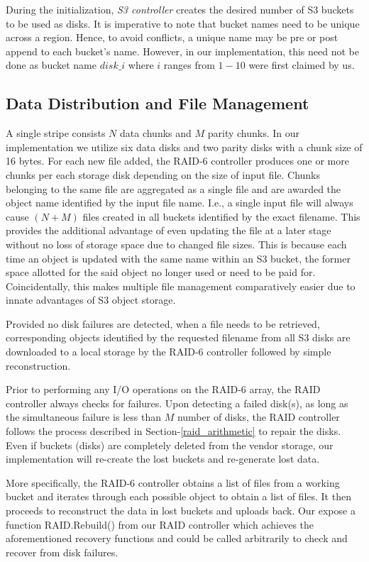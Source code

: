 During the initialization, \textit{S3 controller} creates the desired number of S3 buckets to be used as disks.
It is imperative to note that bucket names need to be unique across a region.
Hence, to avoid conflicts, a unique name may be pre or post append to each bucket's name.
However, in our implementation, this need not be done as bucket name $disk\_i$ where $i$ ranges from $1-10$ were first claimed by us.

\subsection{Data Distribution and File Management}

A single stripe consists $N$ data chunks and $M$ parity chunks.
In our implementation we utilize six data disks and two parity disks with a chunk size of 16 bytes.
For each new file added, the RAID-6 controller produces one or more chunks per each storage disk depending on the size of input file.
Chunks belonging to the same file are aggregated as a single file and are awarded the object name identified by the input file name.
I.e., a single input file will always cause $(N + M)$ files created in all buckets identified by the exact filename.
This provides the additional advantage of even updating the file at a later stage without no loss of storage space due to changed file sizes.
This is because each time an object is updated with the same name within an S3 bucket, the former space allotted for the said object no longer used or need to be paid for.
Coincidentally, this makes multiple file management comparatively easier due to innate advantages of S3 object storage.

 Provided no disk failures are detected, when a file needs to be retrieved, corresponding objects identified by the requested filename from all S3 disks are downloaded to a local storage by the RAID-6 controller followed by simple reconstruction.

Prior to performing any I/O operations on the RAID-6 array, the RAID controller always checks for failures.
Upon detecting a failed disk(s), as long as the simultaneous failure is less than $M$ number of disks, the RAID controller follows the process described in Section-\ref{raid_arithmetic} to repair the disks.
Even if buckets (disks) are completely deleted from the vendor storage, our implementation will re-create the lost buckets and re-generate lost data.

More specifically, the RAID-6 controller obtains a list of files from a working bucket and iterates through each possible object to obtain a list of files.
It then proceeds to reconstruct the data in lost buckets and uploads back.
Our expose a function RAID.Rebuild() from our RAID controller which achieves the aforementioned recovery functions and could be called arbitrarily to check and recover from disk failures.







